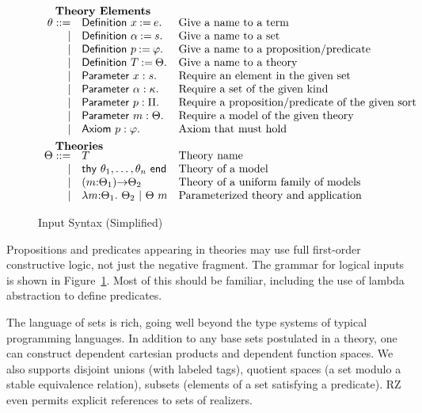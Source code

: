\begin{figure}
\[\begin{array}{rl@{\quad}l}
		\noalign{\textbf{Theory Elements}}
		\ite ::=
		     & \iDefinition{\ix}{\ie}.&\mbox{Give a name to a term}\\
		   | & \iDefinition{\iS}{\is}.&\mbox{Give a name to a set}\\
		   | & \iDefinition{\iP}{\ip}.&\mbox{Give a name to a proposition/predicate}\\
		   | & \iDefinition{\iTH}{\ith}.&\mbox{Give a name to a theory}\\
		   | & \iParameter{\ix}{\is}.&\mbox{Require an element in the given set}\\
		   | & \iParameter{\iS}{\ik}.&\mbox{Require a set of the given kind}\\
		   | & \iParameter{\iP}{\ipt}.&\mbox{Require a proposition/predicate of the given sort}\\
		   | & \iParameter{\iM}{\ith}.&\mbox{Require a model of the given theory}\\
		   | & \iAxiom{\iP}{\ip}.&\mbox{Axiom that must hold}\\[5pt]

  		\noalign{\textbf{Theories}}
		\ith ::= 
		     & \iTH&\mbox{Theory name}\\
		   	| & \ithy{\ite_1,\ldots,\ite_n} &\mbox{Theory of a model}\\
		 	| & \idarrow{\iM}{\ith_1}{\ith_2} &\mbox{Theory of a uniform family of models}\\
		  	| & \ilambda{\iM}{\ith_1}{\ith_2} \ibar 
		      \iapp{\ith}{\iM}&\mbox{Parameterized theory and application}\\
	\end{array}
	\]
	\label{fig:input}
	\caption{Input Syntax (Simplified)}
\end{figure}

Propositions and predicates appearing in theories may use full
first-order constructive logic, not just the negative fragment. The
grammar for logical inputs is shown in Figure~\ref{fig:input}. Most of
this should be familiar, including the use of lambda abstraction to
define predicates.

The language of sets is rich, going well beyond the type systems of
typical programming languages. In addition to any base sets postulated
in a theory, one can construct dependent cartesian products and
dependent function spaces. We also supports disjoint unions (with
labeled tags), quotient spaces (a set modulo a stable equivalence
relation), subsets (elements of a set satisfying a predicate). RZ even
permits explicit references to sets of realizers.

